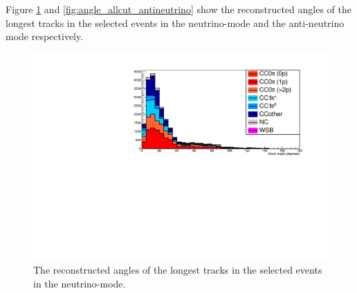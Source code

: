 %


Figure \ref{fig:angle_allcut_neutrino} and \ref{fig:angle_allcut_antineutrino} show the reconstructed angles of the longest tracks in the selected events in the neutrino-mode and the anti-neutrino mode respectively.

\begin{figure}[tbh]
\begin{center}
\includegraphics[width=0.5\linewidth, angle=270]{fig/FHCMuonAngle_StoppedOrThroughGoing.pdf}
\end{center}
\caption{
The reconstructed angles of the longest tracks in the selected events in the neutrino-mode.
}
\label{fig:angle_allcut_neutrino}
\end{figure}

